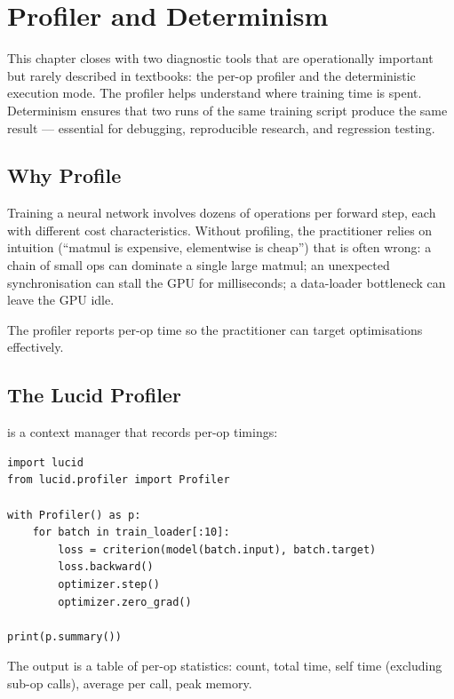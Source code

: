 \chapter{Profiler and Determinism}
\label{ch:profiler_determinism}

This chapter closes  with two
diagnostic tools that are operationally important but rarely
described in textbooks: the per-op profiler and the deterministic
execution mode. The profiler helps understand where training
time is spent. Determinism ensures that two runs of the same
training script produce the same result --- essential for
debugging, reproducible research, and regression testing.

\section{Why Profile}
\label{sec:profiler_determinism:why_profile}

Training a neural network involves dozens of operations per
forward step, each with different cost characteristics. Without
profiling, the practitioner relies on intuition (``matmul is
expensive, elementwise is cheap'') that is often wrong: a
chain of small ops can dominate a single large matmul; an
unexpected synchronisation can stall the GPU for milliseconds; a
data-loader bottleneck can leave the GPU idle.

The profiler reports per-op time so the practitioner can target
optimisations effectively.

\section{The Lucid Profiler}
\label{sec:profiler_determinism:profiler}

 is a context manager that records
per-op timings:

\begin{lstlisting}[style=lucid,language=LucidPython]
import lucid
from lucid.profiler import Profiler

with Profiler() as p:
    for batch in train_loader[:10]:
        loss = criterion(model(batch.input), batch.target)
        loss.backward()
        optimizer.step()
        optimizer.zero_grad()

print(p.summary())
\end{lstlisting}

The output is a table of per-op statistics: count, total time,
self time (excluding sub-op calls), average per call, peak
memory.

